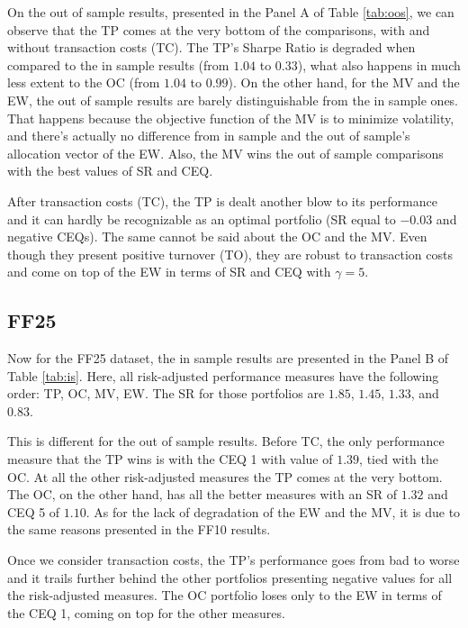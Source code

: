 \documentclass[12pt,oneside,a4paper]{memoir}
\begin{document}
On the out of sample results, presented in the Panel A of Table \ref{tab:oos}, we can observe that the TP comes at the very bottom of the comparisons, with and without transaction costs (TC). The TP's Sharpe Ratio is degraded when compared to the in sample results (from $1.04$ to $0.33$), what also happens in much less extent to the OC (from $1.04$ to $0.99$).
On the other hand, for the MV and the EW, the out of sample results are barely distinguishable from the in sample ones. That happens because the objective function of the MV is to minimize volatility, and there's actually no difference from in sample and the out of sample's allocation vector of the EW. Also, the MV wins the out of sample comparisons with the best values of SR and CEQ.

After transaction costs (TC), the TP is dealt another blow to its performance and it can hardly be recognizable as an optimal portfolio (SR equal to $-0.03$ and negative CEQs). The same cannot be said about the OC and the MV. Even though they present positive turnover (TO), they are robust to transaction costs and come on top of the EW in terms of SR and CEQ with $\gamma=5$.

\subsection*{FF25}

Now for the FF25 dataset, the in sample results are presented in the Panel B of Table \ref{tab:is}.
Here, all risk-adjusted performance measures have the following order: TP, OC, MV, EW.
The SR for those portfolios are $1.85$, $1.45$, $1.33$, and $0.83$.

This is different for the out of sample results. Before TC, the only performance measure that the TP wins is with the CEQ 1 with value of $1.39$, tied with the OC. At all the other risk-adjusted measures the TP comes at the very bottom. The OC, on the other hand, has all the better measures with an SR of $1.32$ and CEQ 5 of $1.10$. As for the lack of degradation of the EW and the MV, it is due to the same reasons presented in the FF10 results.

Once we consider transaction costs, the TP's performance goes from bad to worse and it trails further behind the other portfolios presenting negative values for all the risk-adjusted measures.
The OC portfolio loses only to the EW in terms of the CEQ 1, coming on top for the other measures.
\end{document}
